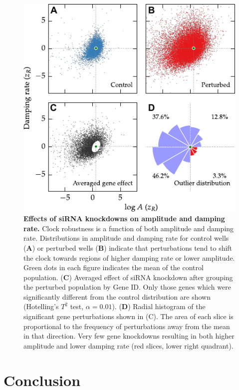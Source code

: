 \documentclass[11pt, letterpaper]{article}
\begin{document}
\begin{figure}[tbp]
  \begin{center}
    \includegraphics[]{figures/pdfs/outliers.pdf}
  \end{center}
  \caption{{\bfseries Effects of siRNA knockdowns on amplitude and damping rate.}
  Clock robustness is a function of both amplitude and damping rate.
  Distributions in amplitude and damping rate for control wells ({\bfseries A}) or perturbed wells ({\bfseries B}) indicate that perturbations tend to shift the clock towards regions of higher damping rate or lower amplitude. Green dots in each figure indicates the mean of the control population.
({\bfseries C}) Averaged effect of siRNA knockdown after grouping the perturbed population by Gene ID. Only those genes which were significantly different from the control distribution are shown (Hotelling's $T^2$ test, $\alpha = 0.01$).
({\bfseries D}) Radial histogram of the significant gene perturbations shown in (C). The area of each slice is proportional to the frequency of perturbations away from the mean in that direction. Very few gene knockdowns resulting in both higher amplitude and lower damping rate (red slices, lower right quadrant).
}
\label{fig:outlier_dist}
\end{figure}

\section*{Conclusion}
\end{document}
